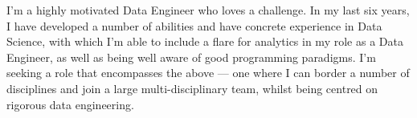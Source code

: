 \documentclass[a4paper]{limecv}
\begin{document}
  
  \begin{cvSidebar}
   

    \begin{cvContact}
    \end{cvContact}
  
    \begin{cvProfile}
      \begin{flushleft}
      I'm a highly motivated Data Engineer who loves a challenge. In my last six years, I have developed a number of abilities and have concrete experience in Data Science, with which I'm able to include
      a flare for analytics in my role as a Data Engineer, as well as being well aware of good programming paradigms. I'm seeking
      a role that encompasses the above — one where I can border a number of disciplines and join a large multi-disciplinary team, whilst being centred on rigorous data engineering.
      \end{flushleft}
    \end{cvProfile}
    
    \begin{cvLanguages}
    \end{cvLanguages}
    
    \begin{cvInterests}[short]
      \cvInterestsProfessional
      \cvInterestsPersonal
    \end{cvInterests}
    
    
  \end{cvSidebar}
\end{document}

